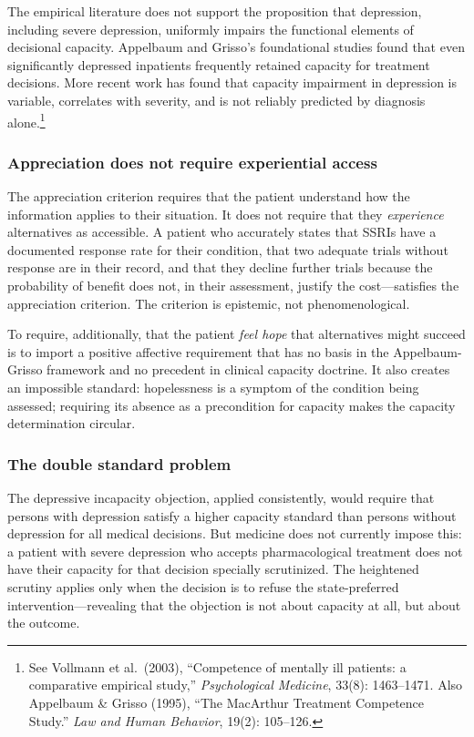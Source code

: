 \documentclass[11pt, letterpaper]{article}
\begin{document}
The empirical literature does not support the proposition that depression, including
severe depression, uniformly impairs the functional elements of decisional capacity.
Appelbaum and Grisso's foundational studies found that even significantly depressed
inpatients frequently retained capacity for treatment decisions. More recent work has
found that capacity impairment in depression is variable, correlates with severity,
and is not reliably predicted by diagnosis alone.\footnote{%
  See Vollmann et al.\ (2003), ``Competence of mentally ill patients: a comparative
  empirical study,'' \textit{Psychological Medicine}, 33(8): 1463--1471. Also
  Appelbaum \& Grisso (1995), ``The MacArthur Treatment Competence Study.''
  \textit{Law and Human Behavior}, 19(2): 105--126.}

\subsubsection{Appreciation does not require experiential access}

The appreciation criterion requires that the patient understand how the information
applies to their situation. It does not require that they \textit{experience} alternatives
as accessible. A patient who accurately states that SSRIs have a documented response
rate for their condition, that two adequate trials without response are in their record,
and that they decline further trials because the probability of benefit does not, in
their assessment, justify the cost---satisfies the appreciation criterion. The criterion
is epistemic, not phenomenological.

To require, additionally, that the patient \textit{feel hope} that alternatives might
succeed is to import a positive affective requirement that has no basis in the
Appelbaum-Grisso framework and no precedent in clinical capacity doctrine. It also
creates an impossible standard: hopelessness is a symptom of the condition being
assessed; requiring its absence as a precondition for capacity makes the capacity
determination circular.

\subsubsection{The double standard problem}

The depressive incapacity objection, applied consistently, would require that persons
with depression satisfy a higher capacity standard than persons without depression for
all medical decisions. But medicine does not currently impose this: a patient with
severe depression who accepts pharmacological treatment does not have their capacity
for that decision specially scrutinized. The heightened scrutiny applies only when the
decision is to refuse the state-preferred intervention---revealing that the objection
is not about capacity at all, but about the outcome.
\end{document}
